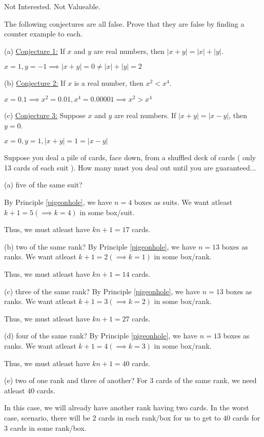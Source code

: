 \bs Not Interested. Not Valueable. \es

\bp  
	The following conjectures are all false. Prove that they are false by finding a counter example to each.

(a) \underline{Conjecture 1:} If $x$ and $y$ are real numbers, then $|x+y| = |x| + |y|$.

\bs
	$x = 1, y = -1 \implies |x+y| = 0 \neq |x| + |y| = 2$
\es

(b) \underline{Conjecture 2:} If $x$ is a real number, then $x^2 < x^4$.

\bs
	$x = 0.1 \implies x^2 = 0.01, x^4 = 0.00001 \implies x^2 > x^4$
\es

(c) \underline{Conjecture 3:} Suppose $x$ and $y$ are real numbers. If $|x+y| = |x-y|$, then $y = 0$.

\bs
	$x = 0, y = 1, |x+y| = 1 = |x-y|$
\es
\ep 


\bp 
	Suppose you deal a pile of cards, face down, from a shuffled deck of cards ( only 13 cards of each suit ). How many must you deal out until you are guaranteed...

	(a) five of the same suit?

	\bs
		By Principle \ref{pigeonhole}, we have $n = 4$ boxes as suits. 
		We want atleast $k + 1 = 5 (\implies k = 4)$ in some box/suit.

		Thus, we must atleast have $kn+1 = 17$ cards.
	\es

	(b) two of the same rank?
	\bs
		By Principle \ref{pigeonhole}, we have $n = 13$ boxes as ranks. 
		We want atleast $k + 1 = 2 (\implies k = 1)$ in some box/rank.

		Thus, we must atleast have $kn+1 = 14$ cards.
	\es

	(c) three of the same rank?
	\bs
		By Principle \ref{pigeonhole}, we have $n = 13$ boxes as ranks. 
		We want atleast $k + 1 = 3 (\implies k = 2)$ in some box/rank.

		Thus, we must atleast have $kn+1 = 27$ cards.
	\es

	(d) four of the same rank?
	\bs
		By Principle \ref{pigeonhole}, we have $n = 13$ boxes as ranks. 
		We want atleast $k + 1 = 4 (\implies k = 3)$ in some box/rank.

		Thus, we must atleast have $kn+1 = 40$ cards.
	\es

	(e) two of one rank and three of another?
	\bs
		For $3$ cards of the same rank, we need atleast $40$ cards.
		
		In this case, we will already have another rank having two cards. 
		In the worst case, scenario, there will be $2$ cards in each rank/box for us to get to $40$ cards for $3$ cards in some rank/box.

